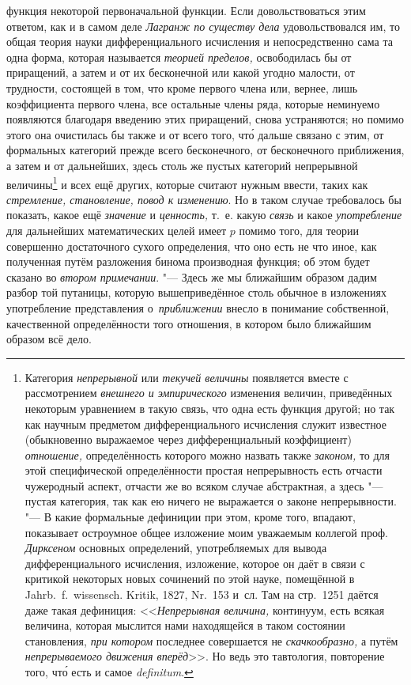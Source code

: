функция некоторой первоначальной функции. Если довольствоваться этим ответом,
как и в самом деле {\em Лагранж по существу дела} удовольствовался им, то общая
теория науки дифференциального исчисления и непосредственно сама та одна форма,
которая называется {\em теорией пределов,} освободилась бы от приращений, а
затем и от их бесконечной или какой угодно малости, от трудности, состоящей в
том, что кроме первого члена или, вернее, лишь коэффициента первого члена, все
остальные члены ряда, которые неминуемо появляются благодаря введению этих
приращений, снова устраняются; но помимо этого она очистилась бы также и от
всего того, чт\'{о} дальше связано с этим, от формальных категорий прежде всего
бесконечного, от бесконечного приближения, а затем и от дальнейших, здесь столь же
пустых категорий непрерывной величины\footnote{Категория {\em непрерывной} или
{\em текучей величины} появляется вместе с рассмотрением
{\em внешнего и эмпирического} изменения величин, приведённых некоторым
уравнением в такую связь, что одна есть функция другой; но так как научным
предметом дифференциального исчисления служит известное (обыкновенно выражаемое
через дифференциальный коэффициент) {\em отношение,} определённость которого
можно назвать также {\em законом,} то для этой специфической
определённости простая непрерывность есть отчасти чужеродный аспект, отчасти же
во всяком случае абстрактная, а здесь "--- пустая категория, так как ею ничего
не выражается о законе непрерывности. "--- В какие формальные дефиниции при
этом, кроме того, впадают, показывает остроумное общее изложение моим уважаемым
коллегой проф. {\em Дирксеном} основных определений, употребляемых для вывода
дифференциального исчисления, изложение, которое он даёт в связи с критикой
некоторых новых сочинений по этой науке, помещённой в Jahrb.~f.~wis\-sen\-sch.
Kri\-tik, 1827, Nr.~153 и~сл. Там на стр.~1251 даётся даже такая дефиниция:
<<{\em Непрерывная величина,} континуум, есть всякая величина, которая мыслится нами
находящейся в таком состоянии становления, {\em при котором} последнее совершается не
{\em скачкообразно,} а путём {\em непрерываемого движения вперёд}>>. Но ведь
это тавтология, повторение того, чт\'{о} есть и самое {\em de\-fi\-ni\-tum}.} и
всех ещё других, которые считают нужным ввести, таких как
{\em стремление, становление, повод к изменению}. Но в таком случае требовалось
бы показать, какое ещё {\em значение} и {\em ценность,} т.~е. какую {\em связь}
и какое {\em употребление} для дальнейших математических целей имеет $p$ помимо
того, для теории совершенно достаточного сухого определения, что оно есть
не что иное, как полученная путём разложения бинома производная функция; об этом
будет сказано во {\em втором примечании}. "--- Здесь же мы ближайшим образом
дадим разбор той путаницы, которую вышеприведённое столь обычное в изложениях
употребление представления о~{\em приближении} внесло в понимание собственной,
качественной определённости того отношения, в котором было ближайшим образом
всё дело.

